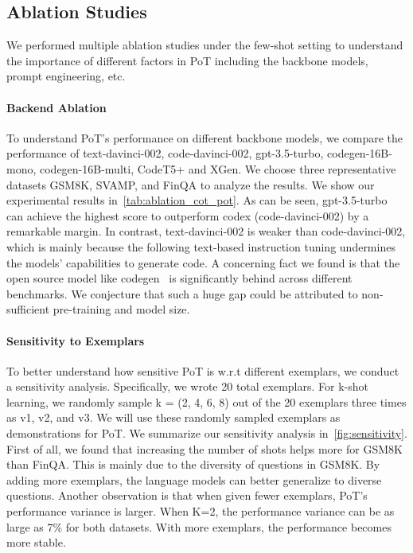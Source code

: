 \subsection{Ablation Studies} We performed multiple ablation studies under the few-shot setting to understand the importance of different factors in PoT including the backbone models, prompt engineering, etc.
\paragraph{Backend Ablation} To understand PoT's performance on different backbone models, we compare the performance of text-davinci-002, code-davinci-002, gpt-3.5-turbo, codegen-16B-mono, codegen-16B-multi, CodeT5+ and XGen. We choose three representative datasets GSM8K, SVAMP, and FinQA to analyze the results. We show our experimental results in~\autoref{tab:ablation_cot_pot}. As can be seen, gpt-3.5-turbo can achieve the highest score to outperform codex (code-davinci-002) by a remarkable margin. In contrast, text-davinci-002 is weaker than code-davinci-002, which is mainly because the following text-based instruction tuning undermines the models' capabilities to generate code. A concerning fact we found is that the open source model like codegen~\cite{nijkamp2022codegen} is significantly behind across different benchmarks. We conjecture that such a huge gap could be attributed to non-sufficient pre-training and model size. 

\paragraph{Sensitivity to Exemplars}

To better understand how sensitive PoT is w.r.t different exemplars, we conduct a sensitivity analysis. Specifically, we wrote 20 total exemplars. For k-shot learning, we randomly sample k = (2, 4, 6, 8) out of the 20 exemplars three times as v1, v2, and v3. We will use these randomly sampled exemplars as demonstrations for PoT. We summarize our sensitivity analysis in~\autoref{fig:sensitivity}. First of all, we found that increasing the number of shots helps more for GSM8K than FinQA. This is mainly due to the diversity of questions in GSM8K. By adding more exemplars, the language models can better generalize to diverse questions. Another observation is that when given fewer exemplars, PoT's performance variance is larger. When K=2, the performance variance can be as large as 7\% for both datasets. With more exemplars, the performance becomes more stable. 

